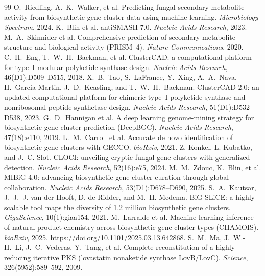\documentclass[11pt]{article}
\theoremstyle{definition}
\begin{document}
\begin{thebibliography}{99}\small
{} O.~Riedling, A.~K.~Walker, et al.
Predicting fungal secondary metabolite activity from biosynthetic gene cluster data using
machine learning. \emph{Microbiology Spectrum}, 2024.
 K.~Blin et al. antiSMASH 7.0.
\emph{Nucleic Acids Research}, 2023.
 M.~A.~Skinnider et al. Comprehensive prediction of
secondary metabolite structure and biological activity (PRISM~4).
\emph{Nature Communications}, 2020.
 C.~H.~Eng, T.~W.~H.~Backman, et al. ClusterCAD: a
computational platform for type~I modular polyketide synthase design.
\emph{Nucleic Acids Research}, 46(D1):D509--D515, 2018.
 X.~B.~Tao, S.~LaFrance, Y.~Xing, A.~A.~Nava,
H.~Garcia Martin, J.~D.~Keasling, and T.~W.~H.~Backman. ClusterCAD 2.0: an updated computational
platform for chimeric type~I polyketide synthase and nonribosomal peptide synthetase design.
\emph{Nucleic Acids Research}, 51(D1):D532--D538, 2023.
 G.~D.~Hannigan et al. A deep learning genome-mining
strategy for biosynthetic gene cluster prediction (DeepBGC).
\emph{Nucleic Acids Research}, 47(18):e110, 2019.
 L.~M.~Carroll et al. Accurate de novo identification of
biosynthetic gene clusters with GECCO. \emph{bioRxiv}, 2021.
 Z. Konkel, L. Kubatko, and J.~C. Slot. CLOCI: unveiling cryptic
fungal gene clusters with generalized detection. \emph{Nucleic Acids Research}, 52(16):e75, 2024.
 M.~M.~Zdouc, K.~Blin, et al. MIBiG 4.0: advancing
biosynthetic gene cluster curation through global collaboration.
\emph{Nucleic Acids Research}, 53(D1):D678--D690, 2025.
 S.~A.~Kautsar, J.~J.~J. van der Hooft, D. de Ridder, and
M.~H. Medema. BiG-SLiCE: a highly scalable tool maps the diversity of 1.2 million biosynthetic gene
clusters. \emph{GigaScience}, 10(1):giaa154, 2021.
 M.~Larralde et al. Machine learning inference of natural
product chemistry across biosynthetic gene cluster types (CHAMOIS). \emph{bioRxiv}, 2025.
\url{https://doi.org/10.1101/2025.03.13.642868}.
 S.~M.~Ma, J.~W.-H.~Li, J.~C.~Vederas, Y.~Tang, et al. Complete
reconstitution of a highly reducing iterative PKS (lovastatin nonaketide synthase LovB/LovC).
\emph{Science}, 326(5952):589--592, 2009.

\end{thebibliography}
\end{document}

